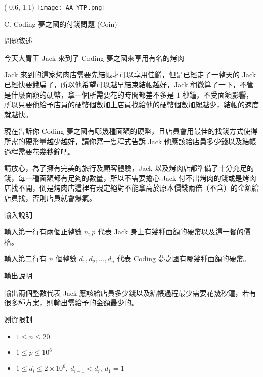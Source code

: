 \documentclass[12pt]{article}
\newcommand{\ProblemTitleFont}{\ProblemTitleMainFont\ProblemTitleCJKFont}
\newcommand{\ProblemTitle}[2]{\noindent\Large{\ProblemTitleFont #1 (#2)}\normalsize\par}
\newcommand{\ProblemSection}[1]{\vspace{0.6cm}\par\noindent\large{\ProblemTitleFont #1}\normalsize\par}
\newcommand{\ProblemStatement}{\ProblemSection{問題敘述}}
\newcommand{\ProblemInput}{\ProblemSection{輸入說明}}
\newcommand{\ProblemOutput}{\ProblemSection{輸出說明}}
\newcommand{\ProblemConstraints}{\ProblemSection{測資限制}}
\begin{document}
\begin{textblock}{0.1}(-0.6,-1.1)
	\texttt{[image: AA\_YTP.png]}
\end{textblock}


\renewcommand{\headrulewidth}{0pt}
\renewcommand{\baselinestretch}{1.3}
\setlength\parindent{24pt}
\setlength\parskip{12pt}
\cfoot{\thepage}

\ProblemTitle{C. Coding 夢之國的付錢問題}{Coin}

\ProblemStatement

今天大胃王 Jack 來到了 Coding 夢之國來享用有名的烤肉

Jack 來到的這家烤肉店需要先結帳才可以享用佳餚，但是已經走了一整天的 Jack 已經快要餓扁了，所以他希望可以越早結束結帳越好，Jack 稍微算了一下，不管是什麼面額的硬幣，拿一個所需要花的時間都差不多是 $1$ 秒鐘，不受面額影響，所以只要他給予店員的硬幣個數加上店員找給他的硬幣個數加總越少，結帳的速度就越快。

現在告訴你 Coding 夢之國有哪幾種面額的硬幣，且店員會用最佳的找錢方式使得所需的硬幣量越少越好，請你寫一隻程式告訴 Jack 他應該給店員多少錢以及結帳過程需要花幾秒鐘吧。

請放心，為了擁有完美的旅行及顧客體驗，Jack 以及烤肉店都準備了十分充足的錢，每一種面額都有足夠的數量，所以不需要擔心 Jack 付不出烤肉的錢或是烤肉店找不開，倒是烤肉店這裡有規定絕對不能拿高於原本價錢兩倍（不含）的金額給店員找，否則店員就會爆氣。

\ProblemInput

輸入第一行有兩個正整數 $n, p$ 代表 Jack 身上有幾種面額的硬幣以及這一餐的價格。

輸入第二行有 $n$ 個整數 $d_1,d_2,...,d_n$ 代表 Coding 夢之國有哪幾種面額的硬幣。

\ProblemOutput

輸出兩個整數代表 Jack 應該給店員多少錢以及結帳過程最少需要花幾秒鐘，若有很多種方案，則輸出需給予的金額最少的。

\clearpage

\ProblemConstraints

\begin{itemize}
    \item $1 \le n \le 20$
    \item $1 \le p \le 10^6$
    \item $1 \le d_i \le 2\times10^6,\ d_{i-1} < d_i,\ d_1=1$
\end{itemize}
\end{document}
